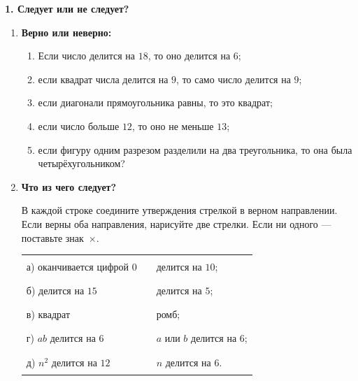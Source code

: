 \begin{center}
    {\large\bfseries 1. Следует или не следует?}
\end{center}

\footnotesize

\begin{center}
\end{center}

\begin{enumerate}[itemsep=0.55em]

\item \textbf{Верно или неверно:}

\begin{enumerate}[label={},leftmargin=1.7em,itemsep=0.65em]
\item[а)] Если число делится на $18$, то оно делится на $6$;
\item[б)] если квадрат числа делится на $9$, то само число делится на $9$;
\item[в)] если диагонали прямоугольника равны, то это квадрат;
\item[г)] если число больше $12$, то оно не меньше $13$;
\item[д)] если фигуру одним разрезом разделили на два треугольника, то она была четырёхугольником?
\end{enumerate}

\item \textbf{Что из чего следует?}

В каждой строке соедините утверждения стрелкой в верном направлении.
Если верны оба направления, нарисуйте две стрелки. Если ни одного — поставьте знак~$\times$.

\begin{tabularx}{\linewidth}{@{}>{\raggedright\arraybackslash}X c >{\raggedright\arraybackslash}X@{}}
а) оканчивается цифрой $0$ & \rule{1cm}{0.4pt} & делится на $10$; \\[0.4em]
б) делится на $15$ & \rule{1cm}{0.4pt} & делится на $5$; \\[0.4em]
в) квадрат & \rule{1cm}{0.4pt} & ромб; \\[0.4em]
г) $ab$ делится на $6$ & \rule{1cm}{0.4pt} & $a$ или $b$ делится на $6$; \\[0.4em]
д) $n^2$ делится на $12$ & \rule{1cm}{0.4pt} & $n$ делится на $6$.
\end{tabularx}


\end{enumerate}
